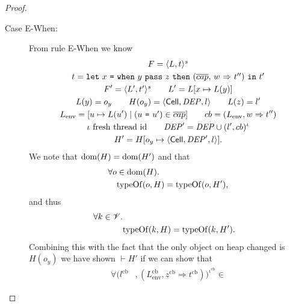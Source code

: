 \begin{proof}
\begin{description}
\begin{description}
\begin{description}
            \item[Case {\sc E-When}:] From rule {\sc E-When} we know
              \begin{equation}
                \begin{gathered}
                  F = \mbox{$\langle L, t \rangle^s$} \\ 
                  t = \mbox{\mdseries\texttt{let}~$x$~\texttt{=}~$\mbox{\mdseries\texttt{when}~$y$~\texttt{pass}~$z$~\texttt{then}~$\mbox{\mdseries($\overline{cap}$, $w$~$\Rightarrow$~$t''$)}$}$~\texttt{in}~$t'$} \\
                  F' = \mbox{$\langle L', t' \rangle^s$} \quad\quad L' = L[x \mapsto L(y)] \\
                  L(y) = o_y \quad\quad H(o_y) = \mbox{$\langle \mbox{$\mathsf{Cell}$}{}, \mathit{DEP}, l \rangle$} \quad\quad L(z) = l' \\
                  L_{\text{env}} = [u \mapsto L(u') \mid (\mbox{\mdseries$u$~\texttt{=}~$u'$}) \in
                  \overline{cap}] \quad\quad cb = (L_{\text{env}}, w \Rightarrow
                  t'') \\
                  \iota \text{ fresh thread id} \quad\quad \mathit{DEP}' = \mathit{DEP} \cup (l',
                  cb)^\iota
                  \\
                  H' = H[o_y \mapsto \mbox{$\langle \mbox{$\mathsf{Cell}$}{}, \mathit{DEP}', l \rangle$}].
                \end{gathered}
              \end{equation}
              We note that $\mbox{$\mathrm{dom}$}(H) = \mbox{$\mathrm{dom}$}(H')$ and that
              \begin{equation} \label{eq:ewhen-h5}
                \begin{aligned}
                  \forall o &\in \mbox{$\mathrm{dom}$}(H).  \\
                    &\mbox{$\mathrm{typeOf}$}(o, H) = \mbox{$\mathrm{typeOf}$}(o, H'),
                \end{aligned}
              \end{equation}
              and thus
              \begin{equation}
                \begin{aligned}
                  \forall k \in \mathscr{V} . \\
                    &\mbox{$\mathrm{typeOf}$}(k, H) = \mbox{$\mathrm{typeOf}$}(k, H').
                \end{aligned}
              \end{equation}
              Combining this with the fact that the only object on heap changed
              is $H(o_y)$ we have shown $\vdash H'$ if we can show that
              \begin{equation}
                \begin{aligned}
                  \forall (l^{\text{cb}}&, (L^{\text{cb}}_{\text{env}},
                  z^{\text{cb}} \Rightarrow t^{\text{cb}}))^{\iota^{\text{cb}}} \in

\end{aligned}
\end{equation}
\end{description}
\end{description}
\end{description}
\end{proof}
